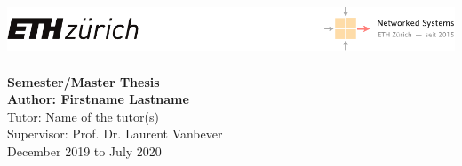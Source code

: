 \documentclass[11pt,oneside]{book}
\begin{document}
\begin{titlepage}
    \centering
    \includegraphics[width=\textwidth]{figures/eth-nsg-header}\\[60mm]
    {\Huge\bf{}}\\[10mm]
    {\Large\bf\sf Semester/Master Thesis}\\[3mm]
    {\Large\bf\sf Author: Firstname Lastname} \\[5mm]
    {\sf Tutor: Name of the tutor(s)}\\[5mm]
    {\sf Supervisor: Prof. Dr. Laurent Vanbever}\\[30mm]
    {\sf December 2019 to July 2020}
\end{titlepage}

\thispagestyle{empty}
\newpage
{}


\clearpage
\setcounter{tocdepth}{2}
\tableofcontents
\clearpage









\clearpage




\clearpage
\appendix
{}


\end{document}
